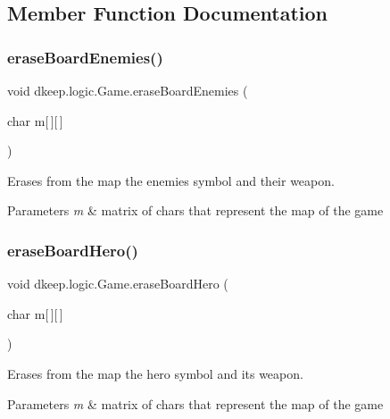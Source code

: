 \subsection{Member Function Documentation}
\mbox{\label{classdkeep_1_1logic_1_1_game_acb0bd46f08b7987f30692afcc49525cf}} 
\subsubsection{\texorpdfstring{erase\+Board\+Enemies()}{eraseBoardEnemies()}}
{\footnotesize\ttfamily void dkeep.\+logic.\+Game.\+erase\+Board\+Enemies (\begin{DoxyParamCaption}\item[{char}]{m\mbox{[}$\,$\mbox{]}\mbox{[}$\,$\mbox{]} }\end{DoxyParamCaption})}

Erases from the map the enemies symbol and their weapon. 
\begin{DoxyParams}{Parameters}
{\em m} & matrix of chars that represent the map of the game \\
\hline
\end{DoxyParams}
\mbox{\label{classdkeep_1_1logic_1_1_game_afe09f2713bb62e5ace6943edb3306043}} 
\subsubsection{\texorpdfstring{erase\+Board\+Hero()}{eraseBoardHero()}}
{\footnotesize\ttfamily void dkeep.\+logic.\+Game.\+erase\+Board\+Hero (\begin{DoxyParamCaption}\item[{char}]{m\mbox{[}$\,$\mbox{]}\mbox{[}$\,$\mbox{]} }\end{DoxyParamCaption})}

Erases from the map the hero symbol and its weapon. 
\begin{DoxyParams}{Parameters}
{\em m} & matrix of chars that represent the map of the game \\
\hline
\end{DoxyParams}
\mbox{\label{classdkeep_1_1logic_1_1_game_a5a87ac790c4389d6e6066e19e4be4983}} 
